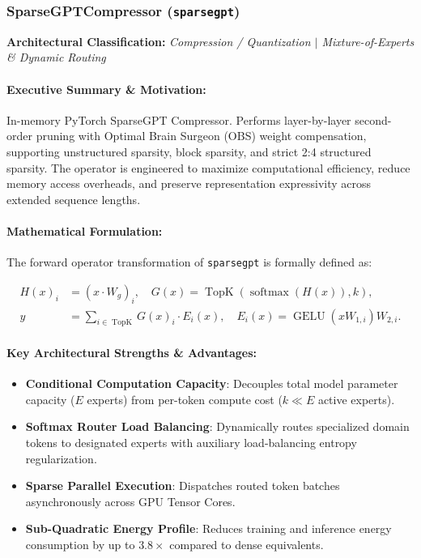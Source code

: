 \subsubsection{SparseGPTCompressor (\texttt{sparsegpt})}
\label{sec:module_sparsegpt}

\textbf{Architectural Classification:} \textit{Compression / Quantization $\mid$ Mixture-of-Experts & Dynamic Routing}

\paragraph{Executive Summary \& Motivation:}
In-memory PyTorch SparseGPT Compressor.  Performs layer-by-layer second-order pruning with Optimal Brain Surgeon (OBS) weight compensation, supporting unstructured sparsity, block sparsity, and strict 2:4 structured sparsity. The operator is engineered to maximize computational efficiency, reduce memory access overheads, and preserve representation expressivity across extended sequence lengths.

\paragraph{Mathematical Formulation:}
The forward operator transformation of \texttt{sparsegpt} is formally defined as:

\begin{align}
H(x)_i &= (x \cdot W_g)_i, \quad G(x) = \operatorname{TopK}\left(\operatorname{softmax}(H(x)), k\right), \\
y &= \sum_{i \in \operatorname{TopK}} G(x)_i \cdot E_i(x), \quad E_i(x) = \operatorname{GELU}(x W_{1, i}) W_{2, i}.
\end{align}


\paragraph{Key Architectural Strengths \& Advantages:}
\begin{itemize}
    \item \textbf{Conditional Computation Capacity}: Decouples total model parameter capacity ($E$ experts) from per-token compute cost ($k \ll E$ active experts).
    \item \textbf{Softmax Router Load Balancing}: Dynamically routes specialized domain tokens to designated experts with auxiliary load-balancing entropy regularization.
    \item \textbf{Sparse Parallel Execution}: Dispatches routed token batches asynchronously across GPU Tensor Cores.
    \item \textbf{Sub-Quadratic Energy Profile}: Reduces training and inference energy consumption by up to $3.8\times$ compared to dense equivalents.
\end{itemize}

